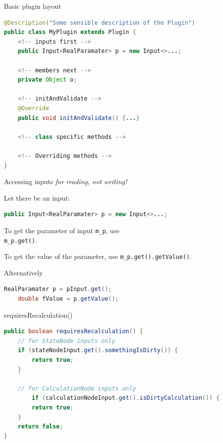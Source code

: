 \documentclass{beamer}
\theoremstyle{definition}
\begin{document}
\begin{frame}[containsverbatim]{Basic plugin layout}

\begin{lstlisting}[language=java]
@Description("Some sensible description of the Plugin")
public class MyPlugin extends Plugin {
    <!-- inputs first -->
    public Input<RealParamater> p = new Input<>...;

    <!-- members next -->
    private Object o;

    <!-- initAndValidate -->
    @Override
    public void initAndValidate() {...}

    <!-- class specific methods -->

    <!-- Overriding methods -->
}
\end{lstlisting}

\end{frame}


\begin{frame}[containsverbatim]{Accessing inputs {\em for reading, not writing!}}

Let there be an input:

\begin{lstlisting}[language=java]
public Input<RealParamater> p = new Input<>...;
\end{lstlisting}\vskip0.5cm

To get the parameter of input {\tt m\_p}, use\\ {\tt m\_p.get()}.\vskip0.5cm

To get the value of the parameter, use {\tt m\_p.get().getValue()}.\vskip0.5cm

Alternatively 

\begin{lstlisting}[language=java]
    RealParamater p = pInput.get();
    double fValue = p.getValue();
\end{lstlisting}

\end{frame}

\begin{frame}[containsverbatim]{requiresRecalculation()}

\begin{lstlisting}[language=java]
public boolean requiresRecalculation() {
	// for StateNode inputs only
	if (stateNodeInput.get().somethingIsDirty()) {
		return true;
	}

	// for CalculationNode inputs only
        if (calculationNodeInput.get().isDirtyCalculation()) {
		return true;
	}
	return false;
}
\end{lstlisting}

\end{frame}
\end{document}

